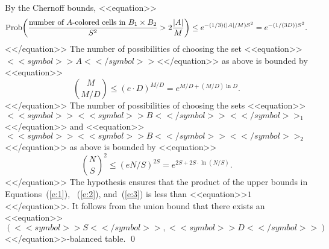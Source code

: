 \documentclass[proceedings]{stacs}
\begin{document}
By the Chernoff bounds,
<<equation>>\begin{equation}
\label{e:1}
{\rm Prob}\bigg( \frac{\mbox{number of $A$-colored cells in $B_1 \times B_2$}}{S^2} > 2 \frac{|A|}{M}\bigg) \leq e^{-(1/3) (|A|/M) S^2} = e^{-(1/(3D))S^2}.
\end{equation}<</equation>>
The number of possibilities of choosing the set <<equation>>$<<symbol>>A<</symbol>>$<</equation>> as above is bounded by
<<equation>>\begin{equation}
\label{e:2}
{M \choose M/D} \leq (e\cdot D)^{M/D} = e^{M/D + (M/D) \ln D}.
\end{equation}<</equation>>
The number of possibilities of choosing the sets <<equation>>$<<symbol>><<symbol>>B<</symbol>><</symbol>>_1$<</equation>> and <<equation>>$<<symbol>><<symbol>>B<</symbol>><</symbol>>_2$<</equation>> as above is bounded by
<<equation>>\begin{equation}
\label{e:3}
{N \choose S}^2 \leq (e N/S)^{2S} = e^{2S + 2S \cdot \ln(N/S)}.
\end{equation}<</equation>>
The hypothesis ensures that the product of the upper bounds in Equations~(\ref{e:1}), ~(\ref{e:2}), and~(\ref{e:3}) is less than <<equation>>$1$<</equation>>. It follows from the union bound that there exists an <<equation>>$(<<symbol>>S<</symbol>>,<<symbol>>D<</symbol>>)$<</equation>>-balanced table.
\qed
\medskip
\end{document}
